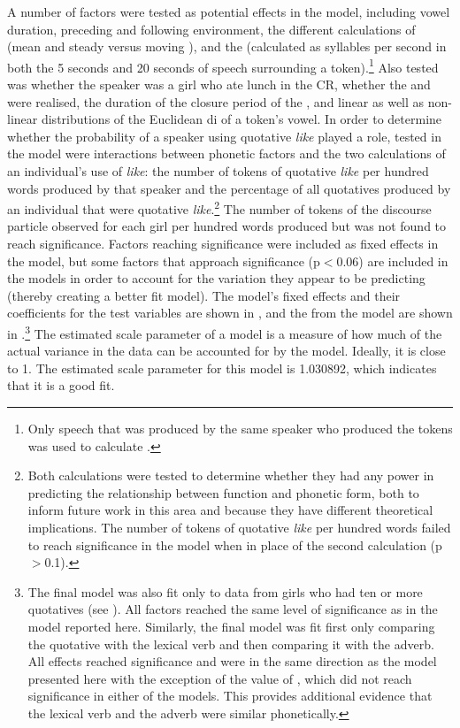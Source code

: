 A number of factors were tested as potential effects in the model, including vowel duration, preceding and following environment, the different calculations of  (mean  and steady versus moving ), and the  (calculated as syllables per second in both the 5 seconds and 20 seconds of speech surrounding a token).\footnote{Only speech that was produced by the same speaker who produced the tokens was used to calculate .} Also tested was whether the speaker was a girl who ate lunch in the CR, whether the  and  were realised, the duration of the closure period of the , and linear as well as non-linear distributions of the Euclidean di of a token's vowel. In order to determine whether the probability of a speaker using quotative \textit{like} played a role, tested in the model were interactions between phonetic factors and the two calculations of an individual's use of \textit{like}: the number of tokens of quotative \textit{like} per hundred words produced by that speaker and the percentage of all quotatives produced by an individual that were quotative \textit{like}.\footnote{Both calculations were tested to determine whether they had any power in predicting the relationship between function and phonetic form, both to inform future work in this area and because they have different theoretical implications. The number of tokens of quotative \textit{like} per hundred words failed to reach significance in the model when in place of the second calculation (p$>$0.1).} The number of tokens of the discourse particle observed for each girl per hundred words produced but was not found to reach significance. Factors reaching significance were included as fixed effects in the model, but some factors that approach significance (p$<$0.06) are included in the models in order to account for the variation they appear to be predicting (thereby creating a better fit model). The model's fixed effects and their coefficients for the test variables are shown in , and the  from the model are shown in .\footnote{The final model was also fit only to data from girls who had ten or more quotatives (see ). All factors reached the same level of significance as in the model reported here. Similarly, the final model was fit first only comparing the quotative with the lexical verb and then comparing it with the adverb. All effects reached significance and were in the same direction as the model presented here with the exception of the value of , which did not reach significance in either of the models. This provides additional evidence that the lexical verb and the adverb were similar phonetically.} The estimated scale parameter of a model is a measure of how much of the actual variance in the data can be accounted for by the model. Ideally, it is close to 1. The estimated scale parameter for this model is 1.030892, which indicates that it is a good fit.
 

